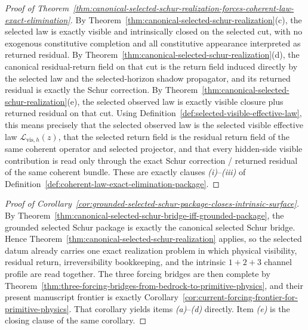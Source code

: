 \begin{proof}[Proof of Theorem~\ref{thm:canonical-selected-schur-realization-forces-coherent-law-exact-elimination}]
\label{proof:thm:canonical-selected-schur-realization-forces-coherent-law-exact-elimination}
By
Theorem~\ref{thm:canonical-selected-schur-realization}(c), the selected law is
exactly visible and intrinsically closed on the selected cut, with no exogenous
constitutive completion and all constitutive appearance interpreted as returned
residual. By
Theorem~\ref{thm:canonical-selected-schur-realization}(d), the canonical
residual-return field on that cut is the return field induced directly by the
selected law and the selected-horizon shadow propagator, and its returned
residual is exactly the Schur correction. By
Theorem~\ref{thm:canonical-selected-schur-realization}(e), the selected
observed law is exactly visible closure plus returned residual on that cut.
Using Definition~\ref{def:selected-visible-effective-law}, this means precisely
that the selected observed law is the selected visible effective law
\(\mathcal L_{\mathrm{vis},h}(z)\), that the selected return field is the
residual return field of the same coherent operator and selected projector, and
that every hidden-side visible contribution is read only through the exact
Schur correction / returned residual of the same coherent bundle. These are
exactly clauses \emph{(i)}--\emph{(iii)} of
Definition~\ref{def:coherent-law-exact-elimination-package}.
\end{proof}

\begin{proof}[Proof of Corollary~\ref{cor:grounded-selected-schur-package-closes-intrinsic-surface}]
\label{proof:cor:grounded-selected-schur-package-closes-intrinsic-surface}
By
Theorem~\ref{thm:canonical-selected-schur-bridge-iff-grounded-package}, the
grounded selected Schur package is exactly the canonical selected Schur bridge.
Hence Theorem~\ref{thm:canonical-selected-schur-realization} applies, so the
selected datum already carries one exact realization problem in which physical
visibility, residual return, irreversibility bookkeeping, and the intrinsic
\(1+2+3\) channel profile are read together. The three forcing bridges are
then complete by
Theorem~\ref{thm:three-forcing-bridges-from-bedrock-to-primitive-physics}, and
their present manuscript frontier is exactly
Corollary~\ref{cor:current-forcing-frontier-for-primitive-physics}. That
corollary yields items \emph{(a)}--\emph{(d)} directly. Item \emph{(e)} is the
closing clause of the same corollary.
\end{proof}

